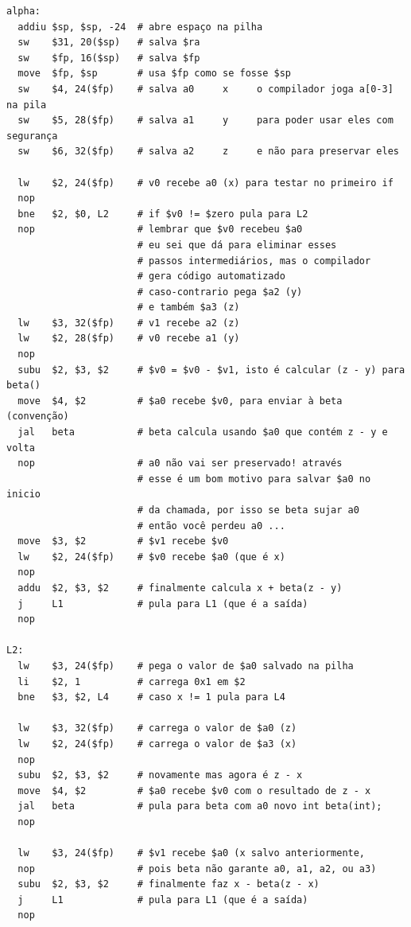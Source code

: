 \documentclass{article}
\begin{document}
\begin{verbatim}
alpha:
  addiu $sp, $sp, -24  # abre espaço na pilha
  sw    $31, 20($sp)   # salva $ra
  sw    $fp, 16($sp)   # salva $fp
  move  $fp, $sp       # usa $fp como se fosse $sp
  sw    $4, 24($fp)    # salva a0     x     o compilador joga a[0-3] na pila
  sw    $5, 28($fp)    # salva a1     y     para poder usar eles com segurança
  sw    $6, 32($fp)    # salva a2     z     e não para preservar eles

  lw    $2, 24($fp)    # v0 recebe a0 (x) para testar no primeiro if
  nop
  bne   $2, $0, L2     # if $v0 != $zero pula para L2
  nop                  # lembrar que $v0 recebeu $a0
                       # eu sei que dá para eliminar esses
                       # passos intermediários, mas o compilador
                       # gera código automatizado
                       # caso-contrario pega $a2 (y)
                       # e também $a3 (z)
  lw    $3, 32($fp)    # v1 recebe a2 (z)
  lw    $2, 28($fp)    # v0 recebe a1 (y)
  nop
  subu  $2, $3, $2     # $v0 = $v0 - $v1, isto é calcular (z - y) para beta()
  move  $4, $2         # $a0 recebe $v0, para enviar à beta (convenção)
  jal   beta           # beta calcula usando $a0 que contém z - y e volta
  nop                  # a0 não vai ser preservado! através
                       # esse é um bom motivo para salvar $a0 no inicio
                       # da chamada, por isso se beta sujar a0
                       # então você perdeu a0 ...
  move  $3, $2         # $v1 recebe $v0
  lw    $2, 24($fp)    # $v0 recebe $a0 (que é x)
  nop
  addu  $2, $3, $2     # finalmente calcula x + beta(z - y)
  j     L1             # pula para L1 (que é a saída)
  nop

L2:
  lw    $3, 24($fp)    # pega o valor de $a0 salvado na pilha
  li    $2, 1          # carrega 0x1 em $2
  bne   $3, $2, L4     # caso x != 1 pula para L4

  lw    $3, 32($fp)    # carrega o valor de $a0 (z)
  lw    $2, 24($fp)    # carrega o valor de $a3 (x)
  nop
  subu  $2, $3, $2     # novamente mas agora é z - x
  move  $4, $2         # $a0 recebe $v0 com o resultado de z - x
  jal   beta           # pula para beta com a0 novo int beta(int);
  nop

  lw    $3, 24($fp)    # $v1 recebe $a0 (x salvo anteriormente,
  nop                  # pois beta não garante a0, a1, a2, ou a3)
  subu  $2, $3, $2     # finalmente faz x - beta(z - x)
  j     L1             # pula para L1 (que é a saída)
  nop


\end{verbatim}
\end{document}
